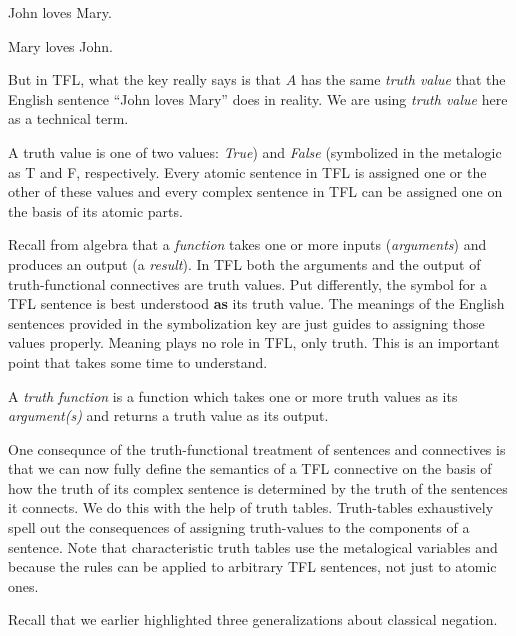 \begin{argument}
\item[A:] John loves Mary.
\item[B:] Mary loves John.
\end{argument}

But in TFL, what the key really says is that $A$ has the same \emph{truth value}
that the English sentence ``John loves Mary'' does in reality. We are using
\emph{truth value} here as a technical term.

\begin{definition}
  A truth value is one of two values: \emph{True}) and \emph{False} (symbolized
  in the metalogic as T and F, respectively. Every atomic sentence in TFL is
  assigned one or the other of these values and every complex sentence
  in TFL can be assigned one on the basis of its atomic parts.
\end{definition}

Recall from algebra that a \emph{function} takes one or more inputs
(\emph{arguments}) and produces an output (a \emph{result}). In TFL both the
arguments and the output of truth-functional connectives are truth values. Put
differently, the symbol for a TFL sentence is best understood \textbf{as} its
truth value. The meanings of the English sentences provided in the symbolization
key are just guides to assigning those values properly. Meaning plays no role in
TFL, only truth. This is an important point that takes some time to understand.

\begin{definition}
  A \emph{truth function} is a function which takes one or more truth values
  as its \emph{argument(s)} and returns a truth value as its output.
\end{definition}

One consequnce of the truth-functional treatment of sentences and connectives is
that we can now fully define the semantics of a TFL connective on the basis of
how the truth of its complex sentence is determined by the truth of the
sentences it connects. We do this with the help of truth tables. Truth-tables
exhaustively spell out the consequences of assigning truth-values to the
components of a sentence. Note that characteristic truth tables use the
metalogical variables \ephi and \epsi because the rules can be applied to
arbitrary TFL sentences, not just to atomic ones.

Recall that we earlier highlighted three generalizations about classical
negation.

